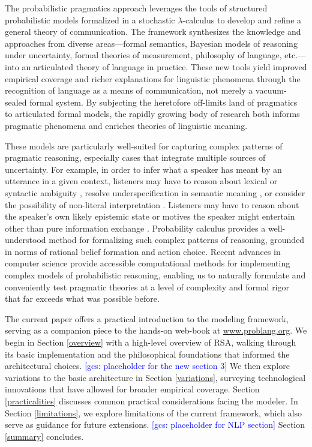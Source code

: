 \documentclass{sp}
\newcommand{\gcs}[1]{\textcolor{blue}{[gcs: #1]}}
\begin{document}
The probabilistic pragmatics approach leverages the tools of structured probabilistic models formalized in a stochastic $\lambda$-calculus to develop and refine a general theory of communication. The framework synthesizes the knowledge and approaches from diverse areas---formal semantics, Bayesian models of reasoning under uncertainty, formal theories of measurement, philosophy of language, etc.---into an articulated theory of language in practice. These new tools yield improved empirical coverage and richer explanations for linguistic phenomena through the recognition of language as a means of communication, not merely a vacuum-sealed formal system. By subjecting the heretofore off-limits land of pragmatics to articulated formal models, the rapidly growing body of research both informs pragmatic phenomena and enriches theories of linguistic meaning.


These models are particularly well-suited for capturing complex patterns of pragmatic reasoning, especially cases that integrate multiple sources of uncertainty. For example, in order to infer what a speaker has meant by an utterance in a given context, listeners may have to reason about lexical or syntactic ambiguity \citep{bergenetal2016,savinellietal2017,FrankeBergen2020:Theory-driven-s}, resolve underspecification in semantic meaning \citep{lassitergoodman2013}, or consider the possibility of non-literal interpretation \citep{kaoetal2014metaphor,kaoetal2014}. Listeners may have to reason about the speaker's own likely epistemic state \citep{goodmanstuhlmuller2013,scontrasgoodman2017,HerbstrittFranke2019:Complex-probabi} or motives the speaker might entertain other than pure information exchange \citep{yoonetal2016,yoonetal2017}. Probability calculus provides a well-understood method for formalizing such complex patterns of reasoning, grounded in norms of rational belief formation and action choice. Recent advances in computer science provide accessible computational methods for implementing complex models of probabilistic reasoning, enabling us to naturally formulate and conveniently test pragmatic theories at a level of complexity and formal rigor that far exceeds what was possible before.

The current paper offers a practical introduction to the modeling framework, serving as a companion piece to the hands-on web-book at \href{https://www.problang.org}{www.problang.org}. We begin in Section \ref{overview} with a high-level overview of RSA, walking through its basic implementation and the philosophical foundations that informed the architectural choices. \gcs{placeholder for the new section 3} We then explore variations to the basic architecture in Section \ref{variations}, surveying technological innovations that have allowed for broader empirical coverage. Section \ref{practicalities} discusses common practical considerations facing the modeler. In Section \ref{limitations}, we explore limitations of the current framework, which also serve as guidance for future extensions. \gcs{placeholder for NLP section} Section \ref{summary} concludes.
\end{document}

